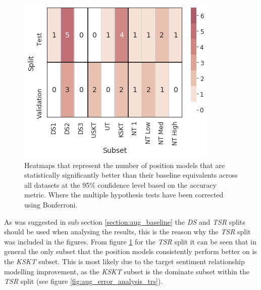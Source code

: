 \begin{figure}[h!]
    \centering
    \includegraphics[scale=0.6]{images/augmentation/methods_performance/Position_Encoding/position_combined_subset_heatmap.png}
    \caption{Heatmaps that represent the number of position models that are statistically significantly better than their baseline equivalents across all datasets at the 95\% confidence level based on the accuracy metric. Where the multiple hypothesis tests have been corrected using Bonferroni.}
    \label{fig:aug_position_combined_subset_heatmap}
\end{figure}

As was suggested in sub section \ref{section:aug_baseline} the \textit{DS} and \textit{TSR} splits should be used when analysing the results, this is the reason why the \textit{TSR} split was included in the figures. From figure \ref{fig:aug_position_combined_subset_heatmap} for the \textit{TSR} split it can be seen that in general the only subset that the position models consistently perform better on is the \textit{KSKT} subset. This is most likely due to the target sentiment relationship modelling improvement, as the \textit{KSKT} subset is the dominate subset within the \textit{TSR} split (see figure \ref{fig:aug_error_analysis_trs}).

